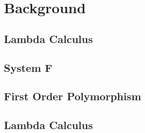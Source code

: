 \chapter{Background}\label{sec:background}

\section{Lambda Calculus}\label{sec:lambda-calc}
\section{System F}\label{sec:lambda-calc}
\section{First Order Polymorphism}\label{sec:lambda-calc}
\section{Lambda Calculus}\label{sec:lambda-calc}
